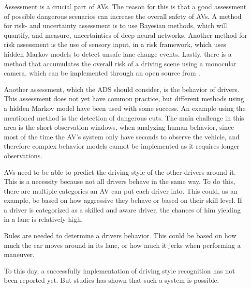 Assessment is a crucial part of AVs.
The reason for this is that a good assessment of possible dangerous scenarios can increase the overall safety of AVs.
A method for risk- and uncertainty assessment is to use Bayesian methods, which will quantify, and measure, uncertainties of deep neural networks.
Another method for risk assessment is the use of sensory input, in a risk framework, which uses hidden Markov models to detect unsafe lane change events.
Lastly, there is a method that accumulates the overall risk of a driving scene using a monocular camera, which can be implemented through an open source from \cite{yurtsever_driving_2019}.
\cite{yurtsever_survey_2019}

Another assessment, which the ADS should consider, is the behavior of drivers.
This assessment does not yet have common practice, but different methods using a hidden Markov model have been used with some success.
An example using the mentioned method is the detection of dangerous cuts.
The main challenge in this area is the short observation windows, when analyzing human behavior, since most of the time the AV's system only have seconds to observe the vehicle, and therefore complex behavior models cannot be implemented as it requires longer observations.
\cite{yurtsever_survey_2019}


AVs need to be able to predict the driving style of the other drivers around it.
This is a necessity because not all drivers behave in the same way.
To do this, there are multiple categories an AV can put each driver into.
This could, as an example, be based on how aggressive they behave or based on their skill level.
If a driver is categorized as a skilled and aware driver, the chances of him yielding in a lane is relatively high.
\cite{yurtsever_survey_2019}

Rules are needed to determine a drivers behavior.
This could be based on how much the car moves around in its lane, or how much it jerks when performing a maneuver.
\cite{yurtsever_survey_2019}

To this day, a successfully implementation of driving style recognition has not been reported yet.
But studies has shown that such a system is possible.
\cite{yurtsever_survey_2019}



